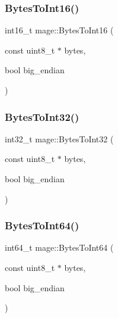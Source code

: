 \hypertarget{namespacemage_a7db26a377fbab44bd501ccdb55a86067}{}\label{namespacemage_a7db26a377fbab44bd501ccdb55a86067} 
\subsubsection{\texorpdfstring{Bytes\+To\+Int16()}{BytesToInt16()}}
{\footnotesize\ttfamily int16\+\_\+t mage\+::\+Bytes\+To\+Int16 (\begin{DoxyParamCaption}\item[{const uint8\+\_\+t $\ast$}]{bytes,  }\item[{bool}]{big\+\_\+endian }\end{DoxyParamCaption})}

\hypertarget{namespacemage_a274862b36cabc10b90dd7148d42a29a6}{}\label{namespacemage_a274862b36cabc10b90dd7148d42a29a6} 
\subsubsection{\texorpdfstring{Bytes\+To\+Int32()}{BytesToInt32()}}
{\footnotesize\ttfamily int32\+\_\+t mage\+::\+Bytes\+To\+Int32 (\begin{DoxyParamCaption}\item[{const uint8\+\_\+t $\ast$}]{bytes,  }\item[{bool}]{big\+\_\+endian }\end{DoxyParamCaption})}

\hypertarget{namespacemage_a09884643d0e3afe8591f9104785ce480}{}\label{namespacemage_a09884643d0e3afe8591f9104785ce480} 
\subsubsection{\texorpdfstring{Bytes\+To\+Int64()}{BytesToInt64()}}
{\footnotesize\ttfamily int64\+\_\+t mage\+::\+Bytes\+To\+Int64 (\begin{DoxyParamCaption}\item[{const uint8\+\_\+t $\ast$}]{bytes,  }\item[{bool}]{big\+\_\+endian }\end{DoxyParamCaption})}

\hypertarget{namespacemage_a1e911bf0ab208ddf9f1ca362db28069d}{}\label{namespacemage_a1e911bf0ab208ddf9f1ca362db28069d} 
